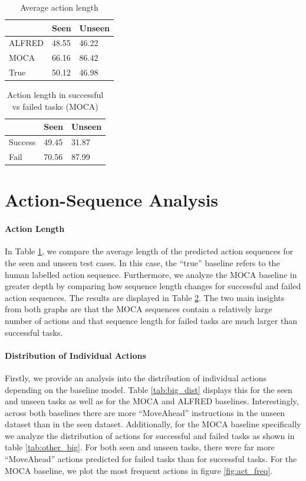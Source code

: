 \documentclass[11pt,a4paper]{article}
\begin{document}
\begin{table}[]
    \centering
    \begin{tabular}{|l|l|l|}
    \hline
           & Seen  & Unseen \\ \hline
    ALFRED & 48.55 & 46.22  \\ \hline
    MOCA   & 66.16 & 86.42  \\ \hline
    True   & 50.12 & 46.98  \\ \hline
    \end{tabular}
    \caption{Average action length}
    \label{tab:action_length}
\end{table}


\begin{table}[]
\centering
\begin{tabular}{|l|l|l|}
\hline
        & Seen  & Unseen \\ \hline
Success & 49.45 & 31.87  \\ \hline
Fail    & 70.56 & 87.99  \\ \hline
\end{tabular}
\caption{Action length in successful vs failed tasks (MOCA)}
\label{tab:success_vs_fail}
\end{table}

\section{Action-Sequence Analysis}

\paragraph{Action Length} 
In Table \ref{tab:action_length}, we compare the average length of the predicted action sequences for the seen and unseen test cases. In this case, the ``true'' baseline refers to the human labelled action sequence. Furthermore, we analyze the MOCA baseline in greater depth by comparing how sequence length changes for successful and failed action sequences. The results are displayed in Table \ref{tab:success_vs_fail}. The two main insights from both graphs are that the MOCA sequences contain a relatively large number of actions and that sequence length for failed tasks are much larger than successful tasks.

\paragraph{Distribution of Individual Actions}
Firstly, we provide an analysis into the distribution of individual actions depending on the baseline model. Table \ref{tab:big_dist} displays this for the seen and unseen tasks as well as for the MOCA and ALFRED baselines. Interestingly, across both baselines there are more ``MoveAhead'' instructions in the unseen dataset than in the seen dataset. Additionally, for the MOCA baseline specifically we analyze the distribution of actions for successful and failed tasks as shown in table \ref{tab:other_big}. For both seen and unseen tasks, there were far more ``MoveAhead'' actions predicted for failed tasks than for successful tasks. For the MOCA baseline, we plot the most frequent actions in figure \ref{fig:act_freq}.
\end{document}
